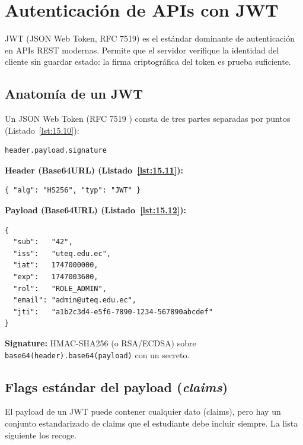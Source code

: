 \documentclass[11pt,a4paper,openany]{book}
\begin{document}
\section{Autenticación de APIs con JWT}

JWT (JSON Web Token, RFC 7519) es el estándar dominante de
autenticación en APIs REST modernas. Permite que el servidor
verifique la identidad del cliente sin guardar estado: la firma
criptográfica del token es prueba suficiente.


\subsection{Anatomía de un JWT}

Un JSON Web Token (RFC 7519 \cite{jones2015jwt}) consta de tres
partes separadas por puntos (Listado~\ref{lst:15.10}):

\begin{lstlisting}[style=shell,numbers=none,caption={Ejemplo de Shell},label=lst:15.10]
header.payload.signature
\end{lstlisting}

\textbf{Header (Base64URL) (Listado~\ref{lst:15.11}):}
\begin{lstlisting}[style=js,numbers=none,caption={Ejemplo de JavaScript},label=lst:15.11]
{ "alg": "HS256", "typ": "JWT" }
\end{lstlisting}

\textbf{Payload (Base64URL) (Listado~\ref{lst:15.12}):}
\begin{lstlisting}[style=js,numbers=none,caption={Ejemplo de JavaScript},label=lst:15.12]
{
  "sub":   "42",
  "iss":   "uteq.edu.ec",
  "iat":   1747000000,
  "exp":   1747003600,
  "rol":   "ROLE_ADMIN",
  "email": "admin@uteq.edu.ec",
  "jti":   "a1b2c3d4-e5f6-7890-1234-567890abcdef"
}
\end{lstlisting}

\textbf{Signature:} HMAC-SHA256 (o RSA/ECDSA) sobre
\texttt{base64(header).base64(payload)} con un secreto.

\subsection{Flags estándar del payload (\emph{claims})}

El payload de un JWT puede contener cualquier dato (claims),
pero hay un conjunto estandarizado de claims que el estudiante debe
incluir siempre. La lista siguiente los recoge.
\end{document}
